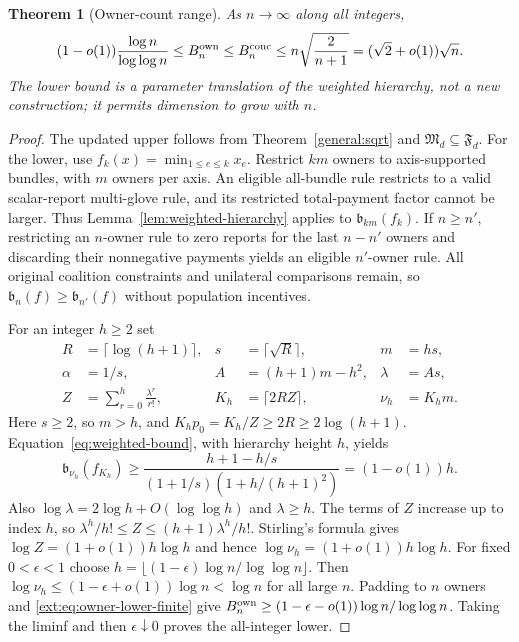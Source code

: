 \documentclass[11pt]{article}
\newtheorem{theorem}{Theorem}[section]
\theoremstyle{definition}\newtheorem{definition}[theorem]{Definition}
\theoremstyle{remark}\newtheorem{remark}[theorem]{Remark}
\begin{document}
\begin{theorem}[Owner-count range]\label{ext:thm:owner-range}
As $n\to\infty$ along all integers,
\[
 (1-o(1))\frac{\log n}{\log\log n}\le B_n^{\rm own}
 \le B_n^{\rm conc}\le n\sqrt{\frac{2}{n+1}}
       =(\sqrt2+o(1))\sqrt n.
\]
The lower bound is a parameter translation of the weighted hierarchy,
not a new construction; it permits dimension to grow with $n$.
\end{theorem}
\begin{proof}
The updated upper follows from Theorem~\ref{general:sqrt} and
$\mathfrak M_d\subseteq\mathfrak F_d$.
For the lower, use $f_k(x)=\min_{1\le e\le k}x_e$.
Restrict $km$ owners to axis-supported bundles, with $m$ owners per axis.
An eligible all-bundle rule restricts to a valid scalar-report multi-glove
rule, and its restricted total-payment factor cannot be larger.
Thus Lemma~\ref{lem:weighted-hierarchy} applies to $\mathfrak b_{km}(f_k)$.
If $n\ge n'$, restricting an $n$-owner rule to zero reports for the last
$n-n'$ owners and discarding their nonnegative payments yields an eligible
$n'$-owner rule.  All original coalition constraints and unilateral comparisons
remain, so $\mathfrak b_n(f)\ge\mathfrak b_{n'}(f)$ without population incentives.

For an integer $h\ge2$ set
\begin{align*}
 R&=\lceil\log(h+1)\rceil, &s&=\lceil\sqrt R\rceil, &m&=hs,\\
 \alpha&=1/s, &A&=(h+1)m-h^2, &\lambda&=As,\\
 Z&=\sum_{r=0}^h\frac{\lambda^r}{r!}, &K_h&=\lceil2RZ\rceil, &\nu_h&=K_hm.
\end{align*}
Here $s\ge2$, so $m>h$, and $K_hp_0=K_h/Z\ge2R\ge2\log(h+1)$.
Equation~\eqref{eq:weighted-bound}, with hierarchy height $h$, yields
\begin{equation}\label{ext:eq:owner-lower-finite}
 \mathfrak b_{\nu_h}(f_{K_h})
 \ge\frac{h+1-h/s}{(1+1/s)(1+h/(h+1)^2)}=(1-o(1))h.
\end{equation}
Also $\log\lambda=2\log h+O(\log\log h)$ and $\lambda\ge h$.
The terms of $Z$ increase up to index $h$, so
$\lambda^h/h!\le Z\le(h+1)\lambda^h/h!$.
Stirling's formula gives $\log Z=(1+o(1))h\log h$ and hence
$\log\nu_h=(1+o(1))h\log h$.
For fixed $0<\epsilon<1$ choose
$h=\lfloor(1-\epsilon)\log n/\log\log n\rfloor$.
Then $\log\nu_h\le(1-\epsilon+o(1))\log n<\log n$ for all large $n$.
Padding to $n$ owners and \eqref{ext:eq:owner-lower-finite} give
$B_n^{\rm own}\ge(1-\epsilon-o(1))\log n/\log\log n$.
Taking the liminf and then $\epsilon\downarrow0$ proves the all-integer lower.
\end{proof}
\end{document}
